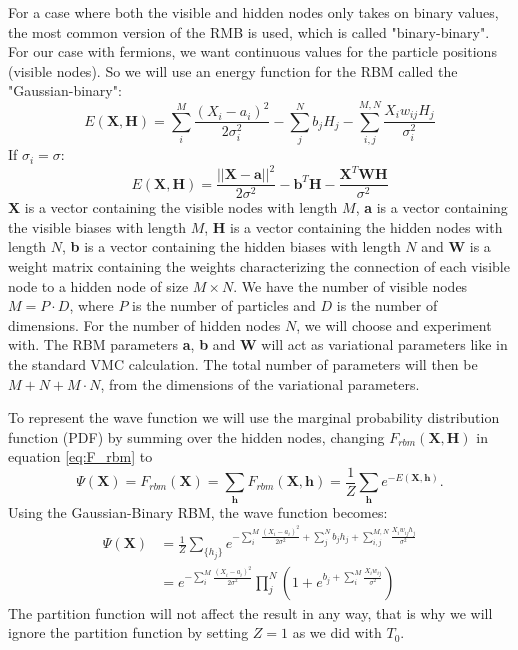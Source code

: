 \documentclass[12pt,a4paper,english]{article}
\begin{document}
For a case where both the visible and hidden nodes only takes on binary values, the most common version of the RMB is used, which is called "binary-binary". For our case with fermions, we want continuous values for the particle positions (visible nodes). So we will use an energy function for the RBM called the "Gaussian-binary":
\begin{equation}
\label{eq:Gaussian_binary}
E(\textbf{X},\textbf{H})=\sum_{i}^{M}\frac{(X_i-a_i)^2}{2\sigma_i^2} - \sum_{j}^{N}b_jH_j - \sum_{i,j}^{M,N}\frac{X_iw_{ij}H_j}{\sigma_i^2}
\end{equation}
If $\sigma_i=\sigma$:
\begin{equation}
\label{eq:Gaussian_binary2}
E(\textbf{X},\textbf{H})=\frac{||\textbf{X}-\textbf{a}||^2}{2\sigma^2} - \textbf{b}^T\textbf{H} - \frac{\textbf{X}^T\textbf{W}\textbf{H}}{\sigma^2}
\end{equation}
\textbf{X} is a vector containing the visible nodes with length $M$, \textbf{a} is a vector containing the visible biases with length $M$, \textbf{H} is a vector containing the hidden nodes with length $N$, \textbf{b} is a vector containing the hidden biases with length $N$ and \textbf{W} is a weight matrix containing the weights characterizing the connection of each visible node to a hidden node of size $M\times N$. We have the number of visible nodes $M=P\cdot D$, where $P$ is the number of particles and $D$ is the number of dimensions. For the number of hidden nodes $N$, we will choose and experiment with. The RBM parameters \textbf{a}, \textbf{b} and \textbf{W} will act as variational parameters like in the standard VMC calculation. The total number of parameters will then be $M+N+M\cdot N$, from the dimensions of the variational parameters.

To represent the wave function we will use the marginal probability distribution function (PDF) by summing over the hidden nodes, changing $F_{rbm}(\textbf{X}, \textbf{H})$ in equation \ref{eq:F_rbm} to 
\begin{equation}
\label{eq:F_rbm_marginal}
\Psi(\textbf{X})=F_{rbm}(\textbf{X})=\sum_{\textbf{h}}F_{rbm}(\textbf{X}, \textbf{h})=\frac{1}{Z}\sum_{\textbf{h}}e^{-E(\textbf{X}, \textbf{h})}.
\end{equation}
Using the Gaussian-Binary RBM, the wave function becomes:
\begin{align}
\Psi(\textbf{X})&=\frac{1}{Z}\sum_{\{h_j\}}e^{-\sum_{i}^{M}\frac{(X_i-a_i)^2}{2\sigma^2} + \sum_{j}^{N}b_jh_j + \sum_{i,j}^{M,N}\frac{X_iw_{ij}h_j}{\sigma^2}}\nonumber\\
\label{eq:wave_func}
&=e^{-\sum_{i}^{M}\frac{(X_i-a_i)^2}{2\sigma^2}}\prod_{j}^{N}\left(1+e^{b_j + \sum_{i}^{M}\frac{X_iw_{ij}}{\sigma^2}}
\right)
\end{align}
The partition function will not affect the result in any way, that is why we will ignore the partition function by setting $Z=1$ as we did with $T_0$.
\end{document}
